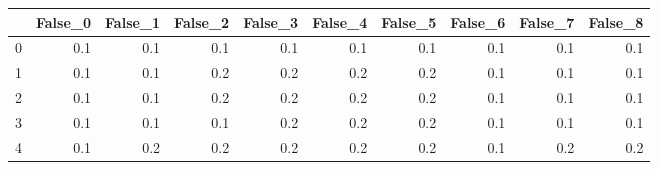 \begin{tabular}{lrrrrrrrrr}
\toprule
{} &  False\_0 &  False\_1 &  False\_2 &  False\_3 &  False\_4 &  False\_5 &  False\_6 &  False\_7 &  False\_8 \\ \hline
\midrule
0 &      0.1 &      0.1 &      0.1 &      0.1 &      0.1 &      0.1 &      0.1 &      0.1 &      0.1 \\ \hline
1 &      0.1 &      0.1 &      0.2 &      0.2 &      0.2 &      0.2 &      0.1 &      0.1 &      0.1 \\ \hline
2 &      0.1 &      0.1 &      0.2 &      0.2 &      0.2 &      0.2 &      0.1 &      0.1 &      0.1 \\ \hline
3 &      0.1 &      0.1 &      0.1 &      0.2 &      0.2 &      0.2 &      0.1 &      0.1 &      0.1 \\ \hline
4 &      0.1 &      0.2 &      0.2 &      0.2 &      0.2 &      0.2 &      0.1 &      0.2 &      0.2 \\ \hline
\bottomrule
\end{tabular}

